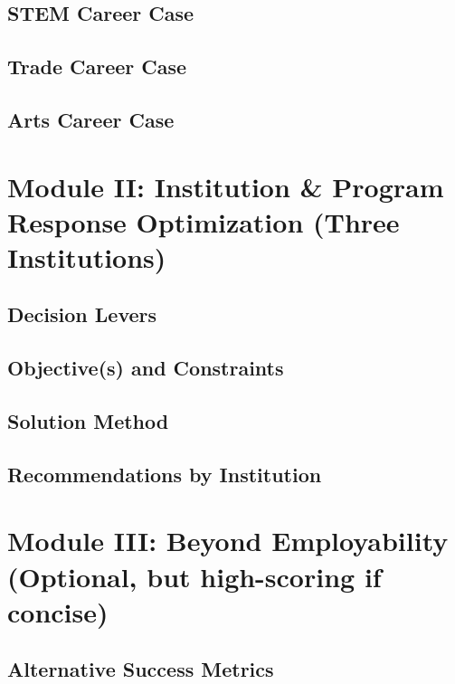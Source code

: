\subsection{STEM Career Case}
\subsection{Trade Career Case}
\subsection{Arts Career Case}

\section{Module II: Institution \& Program Response Optimization (Three Institutions)}
\subsection{Decision Levers}
\subsection{Objective(s) and Constraints}
\subsection{Solution Method}
\subsection{Recommendations by Institution}

\section{Module III: Beyond Employability (Optional, but high-scoring if concise)}
\subsection{Alternative Success Metrics}

